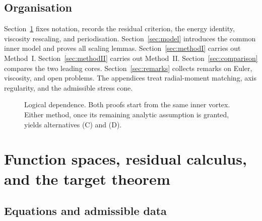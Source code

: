 \subsection{Organisation}
\label{sec:intro-org}

Section~\ref{sec:setup} fixes notation, records the residual criterion, the energy identity, viscosity rescaling, and periodisation. Section~\ref{sec:model} introduces the common inner model and proves all scaling lemmas. Section~\ref{sec:methodI} carries out Method~I. Section~\ref{sec:methodII} carries out Method~II. Section~\ref{sec:comparison} compares the two leading cores. Section~\ref{sec:remarks} collects remarks on {E}uler, viscosity, and open problems. The appendices treat radial-moment matching, axis regularity, and the admissible stress cone.

\begin{figure}[t]
\centering
{}
\caption{Logical dependence. Both proofs start from the same inner vortex. Either method, once its remaining analytic assumption is granted, yields alternatives (C) and (D).}
\label{fig:logic}
\end{figure}

\section{Function spaces, residual calculus, and the target theorem}
\label{sec:setup}

\subsection{Equations and admissible data}

